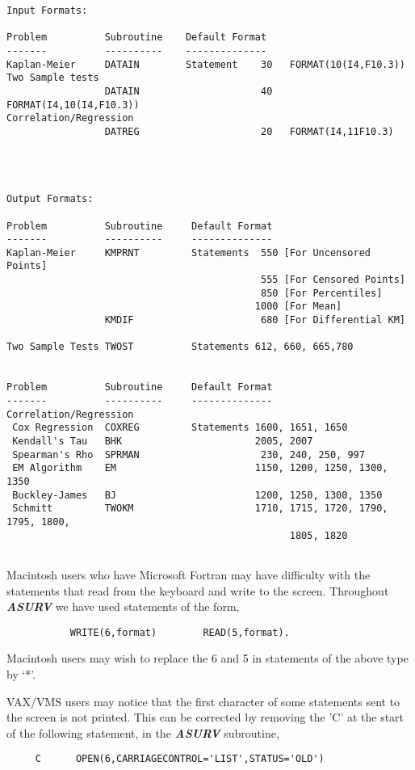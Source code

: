 \begin{verbatim}
Input Formats:

Problem          Subroutine    Default Format      
-------          ----------    --------------
Kaplan-Meier     DATAIN        Statement    30   FORMAT(10(I4,F10.3))
Two Sample tests 
                 DATAIN                     40   FORMAT(I4,10(I4,F10.3))
Correlation/Regression
                 DATREG                     20   FORMAT(I4,11F10.3)




Output Formats:

Problem          Subroutine     Default Format
-------          ----------     --------------
Kaplan-Meier     KMPRNT         Statements  550 [For Uncensored Points] 
                                            555 [For Censored Points]  
                                            850 [For Percentiles]
                                           1000 [For Mean]
                 KMDIF                      680 [For Differential KM]

Two Sample Tests TWOST          Statements 612, 660, 665,780
        

Problem          Subroutine     Default Format
-------          ----------     --------------
Correlation/Regression
 Cox Regression  COXREG         Statements 1600, 1651, 1650
 Kendall's Tau   BHK                       2005, 2007
 Spearman's Rho  SPRMAN                     230, 240, 250, 997
 EM Algorithm    EM                        1150, 1200, 1250, 1300, 1350
 Buckley-James   BJ                        1200, 1250, 1300, 1350
 Schmitt         TWOKM                     1710, 1715, 1720, 1790, 1795, 1800,
                                                 1805, 1820
 
\end{verbatim}                             

     Macintosh users who have Microsoft Fortran may have difficulty with the
statements that read from the keyboard and write to the screen.  Throughout
{\sl\bf ASURV} we have used statements of the form,
\begin{verbatim}
           WRITE(6,format)        READ(5,format).
\end{verbatim}
Macintosh users may wish to replace the 6 and 5 in statements of the above
type by `*'.
           
     VAX/VMS users may notice that the first character of some statements
sent to the screen is not printed.  This can be corrected by removing the 'C' 
at the start of the following statement, in the {\sl\bf ASURV} subroutine,
\begin{verbatim}
     C      OPEN(6,CARRIAGECONTROL='LIST',STATUS='OLD')
\end{verbatim}

